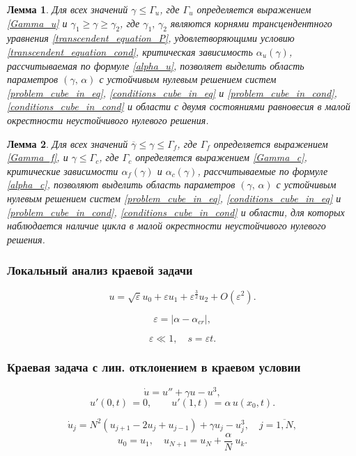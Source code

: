 \documentclass[fullscreen=true, unicode, bookmarks=false]{beamer}
\newtheorem{ruslemma}{Лемма }
\begin{document}
\begin{frame}

\begin{ruslemma}
Для всех значений $\gamma \leqslant \Gamma_u$, где $\Gamma_u$ определяется выражением \eqref{Gamma_u} и $\gamma_1 \geqslant \gamma \geqslant \gamma_2$, где $\gamma_1, \, \gamma_2$ являются корнями трансцендентного уравнения \eqref{transcendent_equation_P}, удовлетворяющими условию \eqref{transcendent_equation_cond}, критическая зависимость $\alpha_u(\gamma)$, рассчитываемая по формуле \eqref{alpha_u}, позволяет выделить область параметров $(\gamma, \, \alpha)$ с устойчивым нулевым решением систем \eqref{problem_cube_in_eq}, \eqref{conditions_cube_in_eq} и \eqref{problem_cube_in_cond}, \eqref{conditions_cube_in_cond} и области с двумя состояниями равновесия в малой окрестности неустойчивого нулевого решения.
\end{ruslemma}
\begin{ruslemma}
Для всех значений $\overline{\gamma} \leqslant \gamma \leqslant \Gamma_f$, где $\Gamma_f$ определяется выражением \eqref{Gamma_f}, и $\gamma \leqslant \Gamma_c$, где $\Gamma_c$ определяется выражением \eqref{Gamma_c}, критические зависимости $\alpha_f(\gamma)$ и $\alpha_c(\gamma)$, рассчитываемые по формуле \eqref{alpha_c}, позволяют выделить область параметров $(\gamma, \, \alpha)$ с устойчивым нулевым решением систем \eqref{problem_cube_in_eq}, \eqref{conditions_cube_in_eq} и \eqref{problem_cube_in_cond}, \eqref{conditions_cube_in_cond} и области, для которых наблюдается наличие цикла в малой окрестности неустойчивого нулевого решения.
\end{ruslemma}


\end{frame}

\begin{frame}
\frametitle{ Локальный анализ краевой задачи }

$$
u = \sqrt{\varepsilon}u_0 + \varepsilon u_1 + \varepsilon^{\frac{3}{2}} u_2 + O(\varepsilon^2).
$$

\vfill

$$ \varepsilon = | \alpha - \alpha_{cr} |, $$

$$ \varepsilon \ll 1, \quad s = \varepsilon t. $$

\end{frame}

\begin{frame}
\frametitle{ Краевая задача с лин. отклонением в краевом условии }

$$
\dot u = u'' + \gamma u - u^3,	
$$
$$
u'(0, t) \, = 0, \qquad u'(1, t) \, = \alpha\,u(x_0, t).
$$

\vfill

$$
\dot{u}_j =  N^2(u_{j+1} - 2u_j + u_{j-1}) + \gamma u_j - u_j^3, \quad j = \overline{1, N},
$$
$$ u_0 = u_1, \quad u_{N+1} = u_N + \frac{\alpha}{N}\:u_k. $$

\end{frame}
\end{document}
